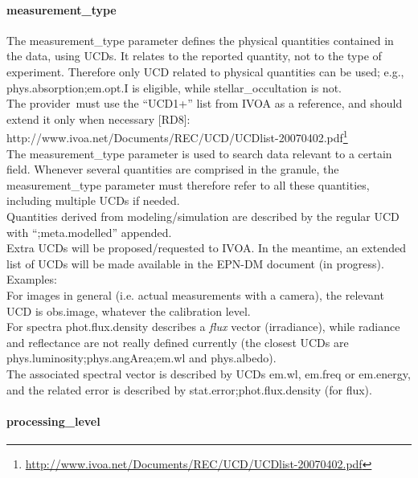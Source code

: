 \documentclass[11pt,a4paper]{ivoa}
\begin{document}
\paragraph{measurement\_type}

The measurement\_type parameter defines the physical quantities contained in the data, using UCDs. It relates to the reported quantity, not to the type of experiment. Therefore only UCD related to physical quantities can be used; e.g., phys.absorption;em.opt.I is eligible, while stellar\_occultation is not. \\ The provider must use the ``UCD1+'' list from IVOA as a reference, and should extend it only when necessary [RD8]:\\ http://www.ivoa.net/Documents/REC/UCD/UCDlist-20070402.pdf\footnote{\url{http://www.ivoa.net/Documents/REC/UCD/UCDlist-20070402.pdf}} \\ The measurement\_type parameter is used to search data relevant to a certain field. Whenever several quantities are comprised in the granule, the measurement\_type parameter must therefore refer to all these quantities, including multiple UCDs if needed.\\Quantities derived from modeling/simulation are described by the regular UCD with ``;meta.modelled'' appended.\\ Extra UCDs will be proposed/requested to IVOA. In the meantime, an extended list of UCDs will be made available in the EPN-DM document (in progress). \\ Examples:\\ For images in general (i.e. actual measurements with a camera), the relevant UCD is obs.image, whatever the calibration level.\\ For spectra phot.flux.density describes a \emph{flux} vector (irradiance), while radiance and reflectance are not really defined currently (the closest UCDs are phys.luminosity;phys.angArea;em.wl and phys.albedo).\\The associated spectral vector is described by UCDs em.wl, em.freq or em.energy, and the related error is described by stat.error;phot.flux.density (for flux).

\paragraph{processing\_level}
\end{document}
